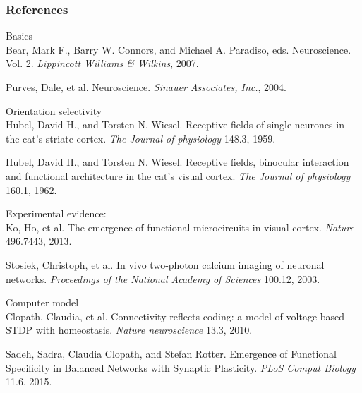 \documentclass[xcolor=x11names,compress]{beamer}
\renewcommand{\(}{\begin{columns}}
\renewcommand{\)}{\end{columns}}
\newcommand{\<}[1]{\begin{column}{#1}}
\renewcommand{\>}{\end{column}}
\begin{document}
\begin{frame}[t]
    \frametitle<presentation>{References}    

    \scriptsize
    Basics\\
    \vspace{0.1cm}
    \tiny
    Bear, Mark F., Barry W. Connors, and Michael A. Paradiso, eds. 
    Neuroscience. Vol. 2. 
    \textit{Lippincott Williams \& Wilkins}, 2007.
    \vspace{0.1cm}

    Purves, Dale, et al.
    Neuroscience.
    \textit{Sinauer Associates, Inc.}, 2004. 
    \vspace{0.1cm}
    
    \scriptsize
    Orientation selectivity\\
    \vspace{0.1cm}
    \tiny
    Hubel, David H., and Torsten N. Wiesel. 
    Receptive fields of single neurones in the cat's striate cortex. 
    \textit{The Journal of physiology} 148.3, 1959.
    \vspace{0.1cm}

    Hubel, David H., and Torsten N. Wiesel. 
    Receptive fields, binocular interaction and functional architecture in the cat's visual cortex.
    \textit{The Journal of physiology} 160.1, 1962.
    \vspace{0.1cm}

    \scriptsize
    Experimental evidence:\\
    \vspace{0.1cm}
    \tiny
    Ko, Ho, et al. 
    The emergence of functional microcircuits in visual cortex. 
    \textit{Nature} 496.7443, 2013.
    \vspace{0.1cm}

    Stosiek, Christoph, et al. 
    In vivo two-photon calcium imaging of neuronal networks.
    \textit{Proceedings of the National Academy of Sciences} 100.12, 2003.
    \vspace{0.1cm}

    \scriptsize
    Computer model\\
    \vspace{0.1cm}
    \tiny
    Clopath, Claudia, et al. 
    Connectivity reflects coding: a model of voltage-based STDP with homeostasis.
    \textit{Nature neuroscience} 13.3, 2010.
    \vspace{0.1cm}

    Sadeh, Sadra, Claudia Clopath, and Stefan Rotter. 
    Emergence of Functional Specificity in Balanced Networks with Synaptic Plasticity.
    \textit{PLoS Comput Biology} 11.6, 2015.
    \vspace{0.1cm}

\end{frame}
\end{document}

